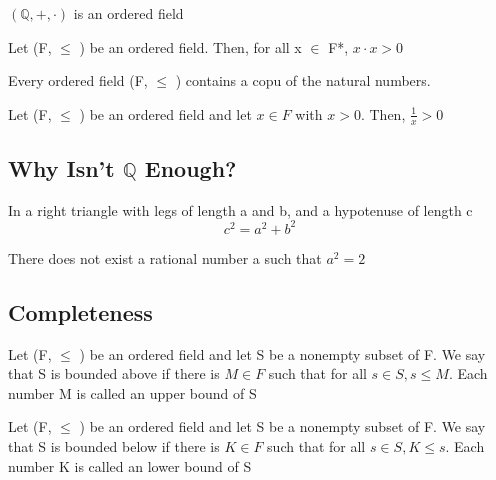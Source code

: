 \documentclass{article}
\begin{document}
\begin{theorem}
    $ (\mathbb{Q}, +, \cdot) $ is an ordered field
\end{theorem}

\begin{theorem}
    Let (F, $\leq$ ) be an ordered field. Then, for all x $\in$ F*, $ x \cdot x > 0 $
\end{theorem}

\begin{theorem}
    Every ordered field (F, $\leq$ ) contains a copu of the natural numbers.
\end{theorem}

\begin{theorem}
    Let (F, $\leq$ ) be an ordered field and let $ x \in F$ with $ x > 0$.
    Then, $ \frac{1}{x} > 0 $
\end{theorem}

\subsection{Why Isn't $\mathbb{Q}$ Enough?}

\begin{theorem}
    In a right triangle with legs of length a and b, and a hypotenuse of length c
    $$ c^2 = a^2 + b^2 $$
\end{theorem}

\begin{theorem}
    There does not exist a rational number a such that $a^2=2$
\end{theorem}

\subsection{Completeness}

\begin{definition}
    Let (F, $\leq$ ) be an ordered field and let S be a nonempty subset of F.
    We say that S is bounded above if there is $ M \in F$ such that for all
    $s \in S, s \leq M$. Each number M is called an upper bound of S
\end{definition}

\begin{definition}
    Let (F, $\leq$ ) be an ordered field and let S be a nonempty subset of F.
    We say that S is bounded below if there is $ K \in F$ such that for all
    $s \in S, K \leq s$. Each number K is called an lower bound of S
\end{definition}
\end{document}
